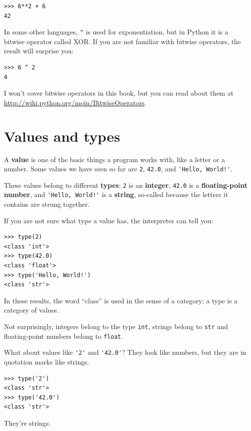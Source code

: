 \documentclass[10pt]{book}
\begin{document}
\begin{verbatim}
>>> 6**2 + 6
42
\end{verbatim}
%
In some other languages, \verb"^" is used for exponentiation, but
in Python it is a bitwise operator called XOR.  If you are not
familiar with bitwise operators, the result will surprise you:

\begin{verbatim}
>>> 6 ^ 2
4
\end{verbatim}
%
I won't cover
bitwise operators in this book, but you can read about
them at \url{http://wiki.python.org/moin/BitwiseOperators}.


\section{Values and types}

A {\bf value} is one of the basic things a program works with, like a
letter or a number.  Some values we have seen so far are {\tt 2},
{\tt 42.0}, and \verb"'Hello, World!'".

These values belong to different {\bf types}:
{\tt 2} is an {\bf integer}, {\tt 42.0} is a {\bf floating-point number},
and \verb"'Hello, World!'" is a {\bf string},
so-called because the letters it contains are strung together.

If you are not sure what type a value has, the interpreter can
tell you:

\begin{verbatim}
>>> type(2)
<class 'int'>
>>> type(42.0)
<class 'float'>
>>> type('Hello, World!')
<class 'str'>
\end{verbatim}
%
In these results, the word ``class'' is used in the sense of
a category; a type is a category of values.

Not surprisingly, integers belong to the type {\tt int},
strings belong to {\tt str} and floating-point
numbers belong to {\tt float}.

What about values like \verb"'2'" and \verb"'42.0'"?
They look like numbers, but they are in quotation marks like
strings.

\begin{verbatim}
>>> type('2')
<class 'str'>
>>> type('42.0')
<class 'str'>
\end{verbatim}
%
They're strings.
\end{document}
